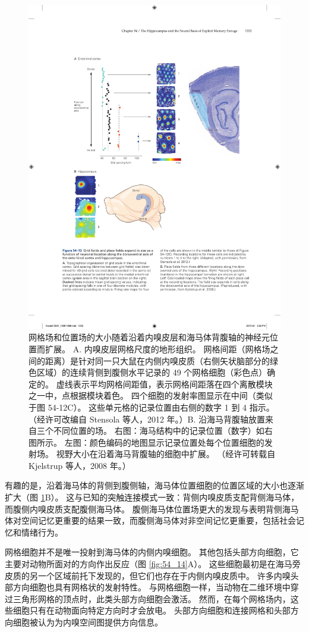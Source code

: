 \begin{figure}[htbp]
	\centering
	\includegraphics[width=0.8\linewidth]{chap54/fig_54_13}
	\caption{网格场和位置场的大小随着沿着内嗅皮层和海马体背腹轴的神经元位置而扩展。 A. 内嗅皮层网格尺度的地形组织。 网格间距（网格场之间的距离）是针对同一只大鼠在内侧内嗅皮质（右侧矢状脑部分的绿色区域）的连续背侧到腹侧水平记录的 49 个网格细胞（彩色点）确定的。 虚线表示平均网格间距值，表示网格间距落在四个离散模块之一中，点根据模块着色。 四个细胞的发射率图显示在中间（类似于图 54-12C）。 这些单元格的记录位置由右侧的数字 1 到 4 指示。 （经许可改编自 Stensola 等人，2012 年。）B. 沿海马背腹轴放置来自三个不同位置的场。 右图：海马结构中的记录位置（数字）如右图所示。 左图：颜色编码的地图显示记录位置处每个位置细胞的发射场。 视野大小在沿着海马背腹轴的细胞中扩展。 （经许可转载自 Kjelstrup 等人，2008 年。）}
	\label{fig:54_13}
\end{figure}

有趣的是，沿着海马体的背侧到腹侧轴，海马体位置细胞的位置区域的大小也逐渐扩大（图 \ref{fig:54_13}B）。 这与已知的突触连接模式一致：背侧内嗅皮质支配背侧海马体，而腹侧内嗅皮质支配腹侧海马体。 腹侧海马体位置场更大的发现与表明背侧海马体对空间记忆更重要的结果一致，而腹侧海马体对非空间记忆更重要，包括社会记忆和情绪行为。

网格细胞并不是唯一投射到海马体的内侧内嗅细胞。 其他包括头部方向细胞，它主要对动物所面对的方向作出反应（图 \ref{fig:54_14}A）。 这些细胞最初是在海马旁皮质的另一个区域前托下发现的，但它们也存在于内侧内嗅皮质中。 许多内嗅头部方向细胞也具有网格状的发射特性。 与网格细胞一样，当动物在二维环境中穿过三角形网格的顶点时，此类头部方向细胞会激活。 然而，在每个网格场内，这些细胞只有在动物面向特定方向时才会放电。 头部方向细胞和连接网格和头部方向细胞被认为为内嗅空间图提供方向信息。

